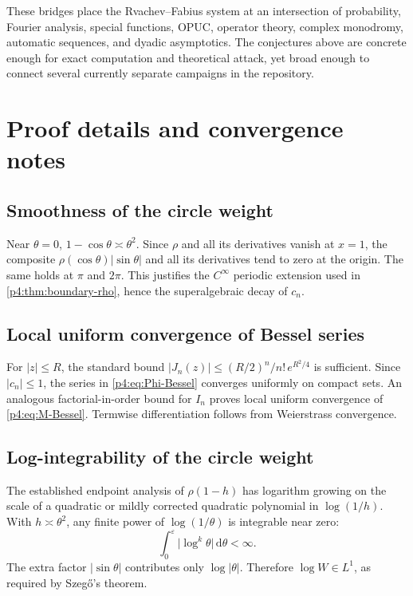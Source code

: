 \documentclass[11pt,oneside]{article}
\theoremstyle{definition}
\newcommand{\dd}{\,\mathrm d}
\begin{document}
These bridges place the Rvachev--Fabius system at an intersection of probability,
Fourier analysis, special functions, OPUC, operator theory, complex monodromy, automatic
sequences, and dyadic asymptotics. The conjectures above are concrete enough for exact
computation and theoretical attack, yet broad enough to connect several currently separate
campaigns in the repository.

\appendix

\section{Proof details and convergence notes}
\label{p4:app:proofs}

\subsection{Smoothness of the circle weight}

Near \(\theta=0\), \(1-\cos\theta\asymp\theta^2\). Since \(\rho\) and all its derivatives
vanish at \(x=1\), the composite \(\rho(\cos\theta)|\sin\theta|\) and all its derivatives tend
to zero at the origin. The same holds at \(\pi\) and \(2\pi\). This justifies the
\(C^\infty\) periodic extension used in \cref{p4:thm:boundary-rho}, hence the superalgebraic
decay of \(c_n\).

\subsection{Local uniform convergence of Bessel series}

For \(|z|\le R\), the standard bound \(|J_n(z)|\le (R/2)^n/n!\,e^{R^2/4}\) is sufficient.
Since \(|c_n|\le1\), the series in \eqref{p4:eq:Phi-Bessel} converges uniformly on compact sets.
An analogous factorial-in-order bound for \(I_n\) proves local uniform convergence of
\eqref{p4:eq:M-Bessel}. Termwise differentiation follows from Weierstrass convergence.

\subsection{Log-integrability of the circle weight}

The established endpoint analysis of \(\rho(1-h)\) has logarithm growing on the scale of a
quadratic or mildly corrected quadratic polynomial in \(\log(1/h)\). With
\(h\asymp\theta^2\), any finite power of \(\log(1/\theta)\) is integrable near zero:
\[
 \int_0^\varepsilon \bigl|\log^k\theta\bigr|\dd\theta<\infty.
\]
The extra factor \(|\sin\theta|\) contributes only \(\log|\theta|\). Therefore
\(\log W\in L^1\), as required by Szeg\H{o}'s theorem.
\end{document}
